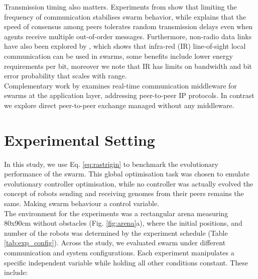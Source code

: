\documentclass[conference]{IEEEtran}
\begin{document}
Transmission timing also matters. Experiments from \cite{aust_hidden_2022} show that limiting the frequency of communication stabilises swarm behavior, while \cite{tsianos_impact_2012} explains that the speed of consensus among peers tolerates random transmission delays even when agents receive multiple out-of-order messages. Furthermore, non-radio data links have also been explored by \cite{trenkwalder_swarmcom_2020}, which shows that infra-red (IR) line-of-sight local communication can be used in swarms, some benefits include lower energy requirements per bit, moreover we note that IR has limits on bandwidth and bit error probability that scales with range. \\ 

Complementary work by \cite{rabbah_real_2021} examines real-time communication middleware for swarms at the application layer, addressing peer-to-peer IP protocols. In contrast we explore direct peer-to-peer exchange managed without any middleware. \\



\section{Experimental Setting}

In this study, we use Eq. \ref{eq:rastrigin} to benchmark the evolutionary performance of the swarm. This global optimisation task was chosen to emulate evolutionary controller optimisation, while no controller was actually evolved the concept of robots sending and receiving genomes from their peers remains the same. Making swarm behaviour a control variable. \\

The environment for the experiments was a rectangular arena measuring 80x90cm without obstacles (Fig. \ref{fig:arena}a), where the initial positions, and number of the robots was determined by the experiment schedule (Table \ref{tab:exp_config}). Across the study, we evaluated swarm under different communication and system configurations. Each experiment manipulates a specific independent variable while holding all other conditions constant. These include:\\
\end{document}
